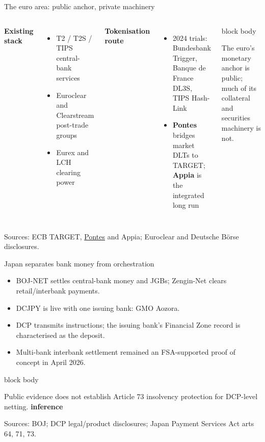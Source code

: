 \documentclass[aspectratio=169,12pt]{beamer}
\newcommand{\rust}[1]{\textcolor{Rust}{\textbf{#1}}}
\newcommand{\blue}[1]{\textcolor{Ocean}{\textbf{#1}}}
\newcommand{\source}[1]{\vfill\par\fontsize{5.4}{6.5}\selectfont\color{Quiet}Sources: #1}
\newcommand{\tightitems}{\setlength{\itemsep}{0.42em}\setlength{\parskip}{0pt}}
\newcommand{\tinf}{\textcolor{Ocean}{\bfseries inference}}
\newenvironment{statement}{%
  \begin{beamercolorbox}[sep=.18cm,rounded=false,wd=\linewidth]{block body}%
  \fontsize{13}{15.5}\selectfont\bfseries
}{\end{beamercolorbox}}
\begin{document}
\begin{frame}{The euro area: public anchor, private machinery}
  \begin{columns}[T,onlytextwidth]
      \rust{Existing stack}
      \begin{itemize}\tightitems
        \item T2 / T2S / TIPS central-bank services
        \item Euroclear and Clearstream post-trade groups
        \item Eurex and LCH clearing power
      \end{itemize}
      \blue{Tokenisation route}
      \begin{itemize}\tightitems
        \item 2024 trials: Bundesbank Trigger, Banque de France DL3S, TIPS Hash-Link
        \item \rust{Pontes} bridges market DLTs to TARGET; \rust{Appia} is the integrated long run
      \end{itemize}
      \begin{statement}
        The euro's monetary anchor is public; much of its collateral and securities machinery is not.
      \end{statement}
  \end{columns}
  \source{ECB TARGET, \href{https://www.ecb.europa.eu/paym/target/pontes/html/index.en.html}{Pontes} and Appia; Euroclear and Deutsche B\"orse disclosures.}
\end{frame}

\begin{frame}{Japan separates bank money from orchestration}
  \begin{itemize}\tightitems
    \item BOJ-NET settles central-bank money and JGBs; Zengin-Net clears retail/interbank payments.
    \item DCJPY is live with one issuing bank: GMO Aozora.
    \item DCP transmits instructions; the issuing bank's Financial Zone record is characterised as the deposit.
    \item Multi-bank interbank settlement remained an FSA-supported proof of concept in April 2026.
  \end{itemize}
  \begin{statement}
    Public evidence does not establish Article 73 insolvency protection for DCP-level netting. \hfill\tinf
  \end{statement}
  \source{BOJ; DCP legal/product disclosures; Japan Payment Services Act arts 64, 71, 73.}
\end{frame}
\end{document}
